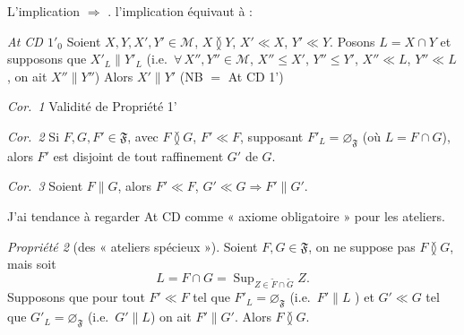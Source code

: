 \documentclass[11pt,a4paper]{article}
\begin{document}
L'implication $\Longrightarrow$ .  l'implication  équivaut à :

\emph{At CD $1'_{0}$} \quad Soient $X, Y, X', Y' \in \mathcal{M}$, $X \between Y$, $X' \ll X$, $Y' \ll Y$. Posons $L = X \cap Y$ et supposons que $X'_{L} \parallel Y'_{L}$ (i.e.\ $\forall\, X'', Y'' \in \mathcal{M}$, $X'' \leq X'$, $Y'' \leq Y'$, $X'' \ll L$, $Y'' \ll L$, on ait $X'' \parallel Y''$) Alors $X' \parallel Y'$ (NB  \ill{} $=$  At CD 1')


\emph{Cor.\ 1} \quad Validité de Propriété 1'

\emph{Cor.\ 2} \quad Si $F, G, F' \in \mathfrak{F}$, avec $F \between G$, $F' \ll F$, supposant $F'_{L} = \varnothing_{\mathfrak{F}}$ (où $L = F \cap G$), alors $F'$ est disjoint de tout raffinement $G'$ de $G$.

\emph{Cor.\ 3} \quad Soient $F \parallel G$, alors $F' \ll F$, $G' \ll G \Longrightarrow F' \parallel G'$.


J'ai tendance à regarder At CD comme « axiome obligatoire » pour les ateliers.


\emph{Propriété 2} (des « ateliers spécieux »). Soient $F, G \in \mathfrak{F}$, \struck{\ill{}} on ne suppose pas $F \between G$, mais soit
\[
  L = F \cap G = \mathop{\mathrm{Sup}}_{Z \in \widetilde{F} \cap \widetilde{G}} Z .
\]
 Supposons que pour tout $F' \ll F$ tel que $F'_{L} = \varnothing_{\mathfrak{F}}$ (i.e.\ $F' \parallel L$ ) et $G' \ll G$ tel que $G'_{L} = \varnothing_{\mathfrak{F}}$ (i.e.\ $G' \parallel L$) on ait $F' \parallel G'$. Alors $F \between G$.
\end{document}
